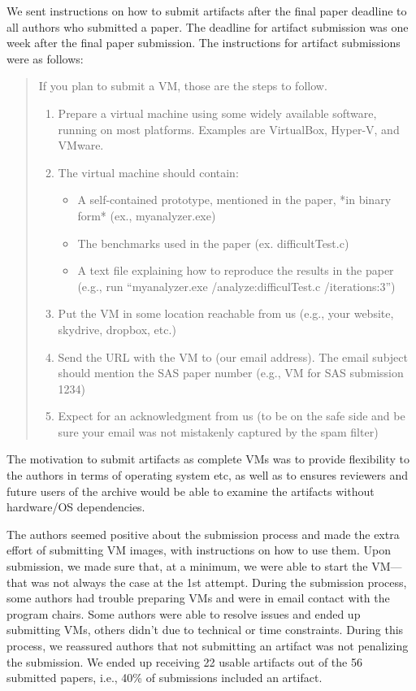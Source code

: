 \documentclass{article}
\begin{document}
\noindent
We sent instructions on how to submit artifacts after the final paper
deadline to all authors who submitted a paper. The deadline for
artifact submission was one week after the final paper submission. The
instructions for artifact submissions were as follows:
\begin{quote}\sffamily
If you plan to submit a VM, those are the steps to follow.
\begin{enumerate}
 \item Prepare a virtual machine using some widely available software,
   running on most platforms. Examples are VirtualBox, Hyper-V, and
   VMware.
 \item The virtual machine should contain:
  \begin{itemize}
    \item A self-contained prototype, mentioned in the paper, *in
      binary form* (ex., myanalyzer.exe)
    \item The benchmarks used in the paper (ex. difficultTest.c)
    \item A text file explaining how to reproduce the results in the paper (e.g., run ``myanalyzer.exe /analyze:difficulTest.c /iterations:3'')
  \end{itemize}
 \item Put the VM in some location reachable from us (e.g., your
   website, skydrive, dropbox, etc.)
 \item Send the URL with the VM to (our email address). The
   email subject should mention the SAS paper number (e.g., VM for SAS
   submission 1234)
 \item Expect for an acknowledgment from us (to be on the safe side
   and be sure your email was not mistakenly captured by the spam
   filter)
\end{enumerate}
\end{quote}

\noindent The motivation to submit artifacts as complete VMs was to
provide flexibility to the authors in terms of operating system etc,
as well as to ensures reviewers and future users of the archive would
be able to examine the artifacts without hardware/OS dependencies.

The authors seemed positive about the submission process and made the
extra effort of submitting VM images, with instructions on how to use
them.  Upon submission, we made sure that, at a minimum, we were able to
start the VM---that was not always the case at the 1st attempt. 
During the submission
process, some authors had trouble preparing VMs and were in email
contact with the program chairs. Some authors were able to resolve
issues and ended up submitting VMs, others didn't due to technical or
time constraints. During this process, we reassured authors that not
submitting an artifact was not penalizing the submission.
We ended up receiving 22 usable artifacts out of the 56 submitted papers,
i.e., 40\% of submissions included an artifact. 
\end{document}
